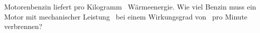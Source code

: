 Motorenbenzin liefert pro Kilogramm \HbzO\ Wärmeenergie. Wie viel Benzin muss ein Motor mit mechanischer Leistung \PbzO\ bei einem Wirkungsgrad von \wgrO\ pro Minute verbrennen?
